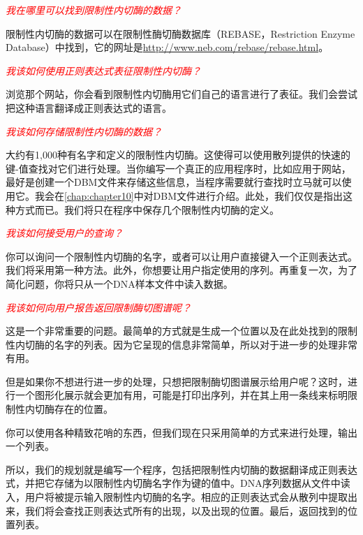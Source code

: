 \textcolor{red}{\textit{我在哪里可以找到限制性内切酶的数据？}}
\begin{adjustwidth}{1cm}{}
限制性内切酶的数据可以在限制性酶切酶数据库（REBASE，Restriction Enzyme Database）中找到，它的网址是\href{http://www.neb.com/rebase/rebase.html}{http://www.neb.com/rebase/rebase.html}。
\end{adjustwidth}

\textcolor{red}{\textit{我该如何使用正则表达式表征限制性内切酶？}}
\begin{adjustwidth}{1cm}{}
浏览那个网站，你会看到限制性内切酶用它们自己的语言进行了表征。我们会尝试把这种语言翻译成正则表达式的语言。
\end{adjustwidth}

\textcolor{red}{\textit{我该如何存储限制性内切酶的数据？}}
\begin{adjustwidth}{1cm}{}
大约有1,000种有名字和定义的限制性内切酶。这使得可以使用散列提供的快速的键-值查找对它们进行处理。当你编写一个真正的应用程序时，比如应用于网站，最好是创建一个DBM文件来存储这些信息，当程序需要就行查找时立马就可以使用它。我会在\autoref{chap:chapter10}中对DBM文件进行介绍。此处，我们仅仅是指出这种方式而已。我们将只在程序中保存几个限制性内切酶的定义。
\end{adjustwidth}

\textcolor{red}{\textit{我该如何接受用户的查询？}}
\begin{adjustwidth}{1cm}{}
你可以询问一个限制性内切酶的名字，或者可以让用户直接键入一个正则表达式。我们将采用第一种方法。此外，你想要让用户指定使用的序列。再重复一次，为了简化问题，你将只从一个DNA样本文件中读入数据。
\end{adjustwidth}

\textcolor{red}{\textit{我该如何向用户报告返回限制酶切图谱呢？}}
\begin{adjustwidth}{1cm}{}
这是一个非常重要的问题。最简单的方式就是生成一个位置以及在此处找到的限制性内切酶的名字的列表。因为它呈现的信息非常简单，所以对于进一步的处理非常有用。

但是如果你不想进行进一步的处理，只想把限制酶切图谱展示给用户呢？这时，进行一个图形化展示就会更加有用，可能是打印出序列，并在其上用一条线来标明限制性内切酶存在的位置。

你可以使用各种精致花哨的东西，但我们现在只采用简单的方式来进行处理，输出一个列表。
\end{adjustwidth}

所以，我们的规划就是编写一个程序，包括把限制性内切酶的数据翻译成正则表达式，并把它存储为以限制性内切酶名字作为键的值中。DNA序列数据从文件中读入，用户将被提示输入限制性内切酶的名字。相应的正则表达式会从散列中提取出来，我们将会查找正则表达式所有的出现，以及出现的位置。最后，返回找到的位置列表。

